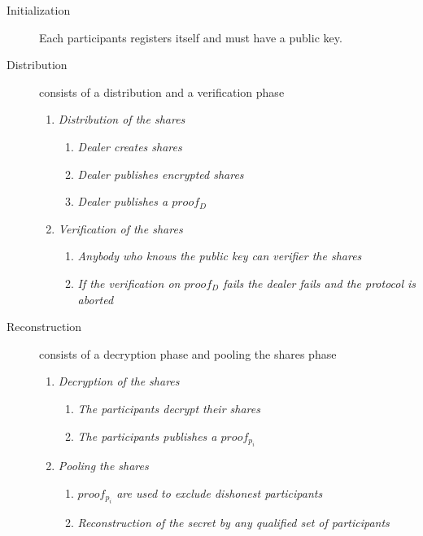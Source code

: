\begin{description}
    \item[Initialization] Each participants registers itself and must have a public key.  
    
    \item[Distribution] consists of a distribution and a verification phase
    
    \begin{enumerate}
        \item \textit{Distribution of the shares}
        \begin{enumerate}
            \item \textit{Dealer creates shares}
            \item \textit{Dealer publishes encrypted shares}    
            \item \textit{Dealer publishes a $proof_D$}   
        \end{enumerate}
        \item \textit{Verification of the shares} 
        \begin{enumerate}
            \item \textit{Anybody who knows the public key can verifier the shares}
            \item \textit{If the verification on $proof_D$ fails the dealer fails and the protocol is aborted}  
        \end{enumerate}
    \end{enumerate}
    
    
    \item[Reconstruction] consists of a decryption phase and pooling the shares phase    
        
    \begin{enumerate}
        \item \textit{Decryption of the shares}
         \begin{enumerate}
            \item \textit{The participants decrypt their shares}
            \item \textit{The participants publishes a $proof_{p_{i}}$}  
        \end{enumerate}
        \item \textit{Pooling the shares}  
        \begin{enumerate}
            \item \textit{$proof_{p_{i}}$ are used to exclude dishonest participants}
            \item \textit{Reconstruction of the secret by any qualified set of participants}  
        \end{enumerate}
    \end{enumerate}        

\end{description}

